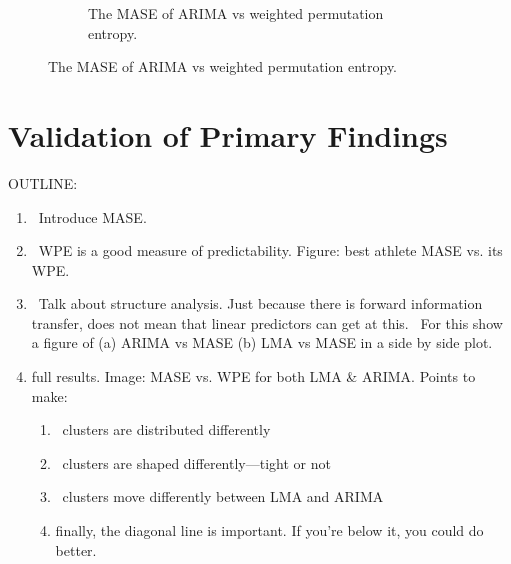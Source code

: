 \documentclass{article}
\newcommand{\cmark}{\ding{51}}
\begin{document}
\begin{figure}[htbp]
\begin{subfigure}{\textwidth}
    \caption{The MASE of ARIMA vs weighted permutation entropy. }
    \label{fig:svd_wwpe}
  \end{subfigure}
\end{figure}






 \section{Validation of Primary Findings} %
 \label{sec:results}


OUTLINE:
\begin{enumerate}
\item \cmark~Introduce MASE.
\item \cmark~WPE is a good measure of predictability.  Figure: best athlete MASE vs.
its WPE.
\item \cmark~Talk about structure analysis. Just because there is forward information
transfer, does not mean that linear predictors can get at this.
\subitem \cmark~For this show a figure of (a) ARIMA vs MASE (b) LMA vs MASE in a side by
side plot.
\item full results.  Image: MASE vs. WPE for both LMA \& ARIMA.  Points to make:
\begin{enumerate}
\item \cmark~clusters are distributed differently
\item \cmark~clusters are shaped differently---tight or not
\item \cmark~clusters move differently between LMA and ARIMA
\item finally, the diagonal line is important. If you're below it, you could do
better.
\end{enumerate}
\end{enumerate}
\end{document}
